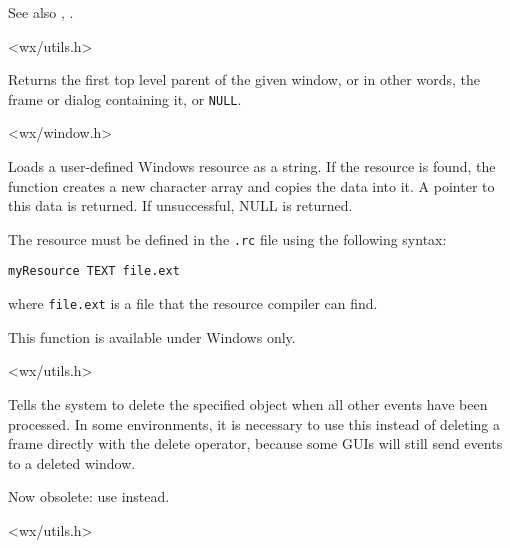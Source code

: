 See also , .


<wx/utils.h>


\label{wxgettoplevelparent}


Returns the first top level parent of the given window, or in other words, the
frame or dialog containing it, or {\tt NULL}.


<wx/window.h>


\label{wxloaduserresource}


Loads a user-defined Windows resource as a string. If the resource is found, the function creates
a new character array and copies the data into it. A pointer to this data is returned. If unsuccessful, NULL is returned.

The resource must be defined in the {\tt .rc} file using the following syntax:

\begin{verbatim}
myResource TEXT file.ext
\end{verbatim}

where {\tt file.ext} is a file that the resource compiler can find.

This function is available under Windows only.


<wx/utils.h>


\label{wxpostdelete}


Tells the system to delete the specified object when
all other events have been processed. In some environments, it is
necessary to use this instead of deleting a frame directly with the
delete operator, because some GUIs will still send events to a deleted window.

Now obsolete: use  instead.


<wx/utils.h>


